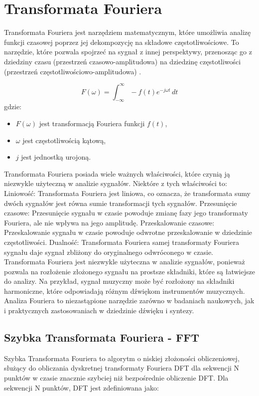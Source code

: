 \section{Transformata Fouriera}

Transformata Fouriera jest narzędziem matematycznym, które umożliwia analizę funkcji czasowej poprzez jej dekompozycję na składowe częstotliwościowe. To narzędzie, które pozwala spojrzeć na sygnał z innej perspektywy, przenosząc go z dziedziny czasu (przestrzeń czasowo-amplitudowa) na dziedzinę częstotliwości (przestrzeń częstotliwościowo-amplitudowa) \cite{fourier_transform_visual}\cite{dsp_understanding}.

\begin{equation}
F(\omega) = \int_{-\infty}^{\infty} -f(t) e^{-j\omega t} \,dt
\end{equation}
gdzie:
\begin{itemize}
    \item \(F(\omega)\) jest transformacją Fouriera funkcji \(f(t)\),
    \item \(\omega\) jest częstotliwością kątową,
    \item \(j\) jest jednostką urojoną.
\end{itemize}

Transformata Fouriera posiada wiele ważnych właściwości, które czynią ją niezwykle użyteczną w analizie sygnałów. Niektóre z tych właściwości to:
Liniowość: Transformata Fouriera jest liniowa, co oznacza, że transformata sumy dwóch sygnałów jest równa sumie transformacji tych sygnałów.
Przesunięcie czasowe: Przesunięcie sygnału w czasie powoduje zmianę fazy jego transformaty Fouriera, ale nie wpływa na jego amplitudę.
Przeskalowanie czasowe: Przeskalowanie sygnału w czasie powoduje odwrotne przeskalowanie w dziedzinie częstotliwości.
Dualność: Transformata Fouriera samej transformaty Fouriera sygnału daje sygnał zbliżony do oryginalnego odwróconego w czasie.
Transformata Fouriera jest niezwykle użyteczna w analizie sygnałów, ponieważ pozwala na rozłożenie złożonego sygnału na prostsze składniki, które są łatwiejsze do analizy. Na przykład, sygnał muzyczny może być rozłożony na składniki harmoniczne, które odpowiadają różnym dźwiękom instrumentów muzycznych. Analiza Fouriera to niezastąpione narzędzie zarówno w badaniach naukowych, jak i praktycznych zastosowaniach w dziedzinie dźwięku i syntezy.
\newpage
\subsection{Szybka Transformata Fouriera - FFT}
Szybka Transformata Fouriera to algorytm o niskiej złożoności obliczeniowej, służący do obliczania dyskretnej transformaty Fouriera DFT dla sekwencji N punktów w czasie znacznie szybciej niż bezpośrednie obliczenie DFT. Dla sekwencji N punktów, DFT jest zdefiniowana jako:

